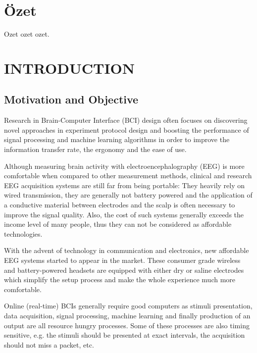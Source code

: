 \documentclass[12pt]{article}
\newcommand\mysection[1]{\vspace*{-0.35cm}\section{#1}\vspace*{6pt}\thispagestyle{empty}}
\newcommand\mysubsection[1]{\subsection{#1}}
\numberwithin{equation}{section}
\numberwithin{figure}{section}
\numberwithin{table}{section}
\begin{document}
\vspace*{-0.35cm}
\thispagestyle{empty}
\section*{\"{O}zet}
\vspace*{6pt}

\par{
Ozet ozet ozet.
}
\clearpage

\mysection{INTRODUCTION}
\thispagestyle{fancy}
\cfoot{}

\mysubsection{Motivation and Objective}\label{seq:intro_motiv}
\par{
    Research in Brain-Computer Interface (BCI) design often focuses
    on discovering novel approaches in experiment protocol design and
    boosting the performance of signal processing and machine learning algorithms
    in order to improve the information transfer rate, the ergonomy and the
    ease of use.
}

\par{
    Although measuring brain activity with electroencephalography (EEG) is more
    comfortable when compared to other measurement methods, clinical and research
    EEG acquisition systems are still far from being portable: They heavily
    rely on wired transmission, they are generally not battery powered and
    the application of a conductive material between electrodes and the scalp is
    often necessary to improve the signal quality. Also, the cost of such systems
    generally exceeds the income level of many people, thus they can not be
    considered as affordable technologies.
}

\par{
    With the advent of technology in communication and electronics, new affordable
    EEG systems started to appear in the market. These consumer grade wireless and
    battery-powered headsets are equipped with either dry or saline
    electrodes which simplify the setup process and make the whole experience
    much more comfortable.
}

\par{
    Online (real-time) BCIs generally require good computers as
    stimuli presentation, data acquisition, signal processing, machine
    learning and finally production of an output are all resource hungry
    processes. Some of these processes are also timing sensitive, e.g.
    the stimuli should be presented at exact intervals, the acquisition
    should not miss a packet, etc.
}
\end{document}
